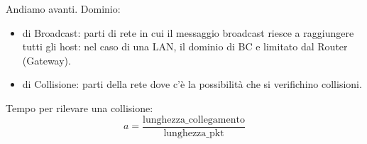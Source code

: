 \noindent Andiamo avanti. Dominio:
\begin{itemize}
    \item di Broadcast: parti di rete in cui il messaggio broadcast riesce a raggiungere tutti gli host: nel caso di una LAN, il dominio di BC e limitato dal Router (Gateway).
    \item di Collisione: parti della rete dove c'è la possibilità che si verifichino collisioni.
\end{itemize}

\noindent Tempo per rilevare una collisione:
\[a = \dfrac{\text{lunghezza\_collegamento}}{\text{lunghezza\_pkt}}\]